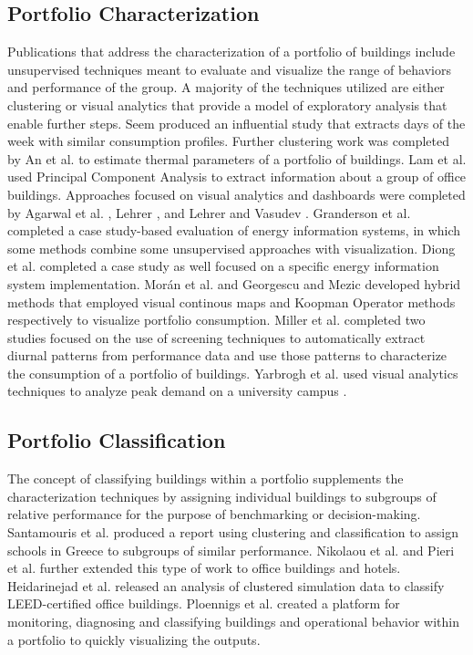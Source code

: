 \subsection{Portfolio Characterization}
Publications that address the characterization of a portfolio of buildings include unsupervised techniques meant to evaluate and visualize the range of behaviors and performance of the group. A majority of the techniques utilized are either clustering or visual analytics that provide a model of exploratory analysis that enable further steps. Seem \cite{seem_pattern_2005} produced an influential study that extracts days of the week with similar consumption profiles. Further clustering work was completed by An et al. \cite{an_estimation_2012} to estimate thermal parameters of a portfolio of buildings. Lam et al. \cite{lam_principal_2008} used Principal Component Analysis to extract information about a group of office buildings. Approaches focused on visual analytics and dashboards were completed by Agarwal et al. \cite{agarwal_energy_2009}, Lehrer \cite{lehrer_research_2009}, and Lehrer and Vasudev \cite{lehrer_visualizing_2011}. Granderson et al. \cite{granderson_building_2010} completed a case study-based evaluation of energy information systems, in which some methods combine some unsupervised approaches with visualization. Diong et al. \cite{diong_establishing_2015} completed a case study as well focused on a specific energy information system implementation. Mor\'an et al. \cite{moran_analysis_2013} and Georgescu and Mezic \cite{georgescu_site-level_2014} developed hybrid methods that employed visual continous maps and Koopman Operator methods respectively to visualize portfolio consumption. Miller et al. \cite{miller_forensically_2015,miller_automated_2015} completed two studies focused on the use of screening techniques to automatically extract diurnal patterns from performance data and use those patterns to characterize the consumption of a portfolio of buildings. Yarbrogh et al. used visual analytics techniques to analyze peak demand on a university campus \cite{yarbrough_visualizing_2015}.

\subsection{Portfolio Classification}
The concept of classifying buildings within a portfolio supplements the characterization techniques by assigning individual buildings to subgroups of relative performance for the purpose of benchmarking or decision-making. Santamouris et al. \cite{santamouris_using_2007} produced a report using clustering and classification to assign schools in Greece to subgroups of similar performance. Nikolaou et al. \cite{nikolaou_application_2012} and Pieri et al. \cite{pieri_identifying_2015} further extended this type of work to office buildings and hotels. Heidarinejad et al. \cite{heidarinejad_cluster_2014} released an analysis of clustered simulation data to classify LEED-certified office buildings. Ploennigs et al. \cite{ploennigs_e2-diagnoser:_2014} created a platform for monitoring, diagnosing and classifying buildings and operational behavior within a portfolio to quickly visualizing the outputs.

